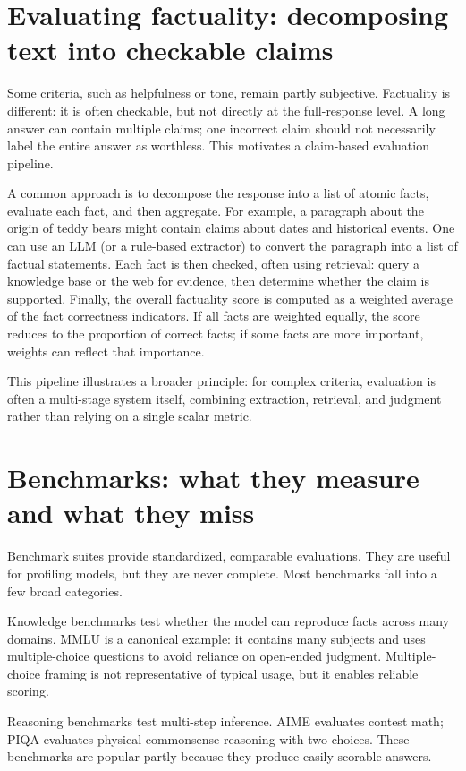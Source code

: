 \section{Evaluating factuality: decomposing text into checkable claims}
Some criteria, such as helpfulness or tone, remain partly subjective. Factuality is different: it is often checkable, but not directly at the full-response level. A long answer can contain multiple claims; one incorrect claim should not necessarily label the entire answer as worthless. This motivates a claim-based evaluation pipeline.

A common approach is to decompose the response into a list of atomic facts, evaluate each fact, and then aggregate. For example, a paragraph about the origin of teddy bears might contain claims about dates and historical events. One can use an LLM (or a rule-based extractor) to convert the paragraph into a list of factual statements. Each fact is then checked, often using retrieval: query a knowledge base or the web for evidence, then determine whether the claim is supported. Finally, the overall factuality score is computed as a weighted average of the fact correctness indicators. If all facts are weighted equally, the score reduces to the proportion of correct facts; if some facts are more important, weights can reflect that importance.

This pipeline illustrates a broader principle: for complex criteria, evaluation is often a multi-stage system itself, combining extraction, retrieval, and judgment rather than relying on a single scalar metric.

\section{Benchmarks: what they measure and what they miss}
Benchmark suites provide standardized, comparable evaluations. They are useful for profiling models, but they are never complete. Most benchmarks fall into a few broad categories.

Knowledge benchmarks test whether the model can reproduce facts across many domains. MMLU is a canonical example: it contains many subjects and uses multiple-choice questions to avoid reliance on open-ended judgment. Multiple-choice framing is not representative of typical usage, but it enables reliable scoring.

Reasoning benchmarks test multi-step inference. AIME evaluates contest math; PIQA evaluates physical commonsense reasoning with two choices. These benchmarks are popular partly because they produce easily scorable answers.

